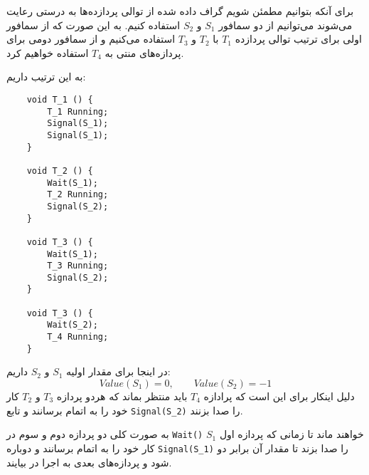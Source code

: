 برای آنکه بتوانیم مطمئن شویم گراف داده شده از توالی پردازده‌ها به درستی رعایت می‌شوند می‌توانیم از دو سمافور
$S_1$
و
$S_2$
استفاده کنیم. به این صورت که از سمافور اولی برای ترتیب توالی پردازده‌
$T_1$
با
$T_2$
و
$T_3$
استفاده می‌کنیم و از سمافور دومی برای پردازه‌های منتی به
$T_4$
استفاده خواهیم کرد.

به این ترتیب داریم:

\LTR
\begin{verbatim}
    void T_1 () {
        T_1 Running;
        Signal(S_1);
        Signal(S_1);
    }

    void T_2 () {
        Wait(S_1);
        T_2 Running;
        Signal(S_2);
    }

    void T_3 () {
        Wait(S_1);
        T_3 Running;
        Signal(S_2);
    }

    void T_3 () {
        Wait(S_2);
        T_4 Running;
    }
\end{verbatim}
\RTL

در اینجا برای مقدار اولیه
$S_1$
و
$S_2$
داریم:
\[
    Value(S_1) = 0, \quad \quad Value(S_2) = -1    
\]
دلیل اینکار برای این است که پرادازه
$T_4$
باید منتظر بماند که هردو پردازه 
$T_3$
و
$T_2$
کار خود را به اتمام برسانند و تابع
\verb|Signal(S_2)|
را صدا بزنند.

به صورت کلی دو پردازه دوم و سوم در
\verb|Wait()|
$S_1$
خواهند ماند تا زمانی که پردازه اول کار خود را به اتمام برسانند و دوباره
\verb|Signal(S_1)|
را صدا بزند تا مقدار آن برابر دو شود و پردازه‌های بعدی به اجرا در بیایند.